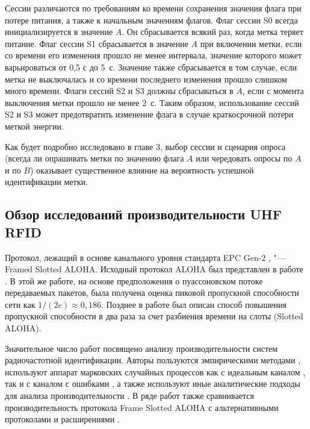 Сессии различаются по требованиям ко времени сохранения значения флага при потере питания, а также к начальным значениям флагов. Флаг сессии S0 всегда инициализируется в значение $A$. Он сбрасывается всякий раз, когда метка теряет питание. Флаг сессии S1 сбрасывается в значение $A$ при включении метки, если со времени его изменения прошло не менее интервала, значение которого может варьироваться от 0,5 с до 5~с. Значение также сбрасывается в том случае, если метка не выключалась и со времени последнего изменения прошло слишком много времени. Флаги сессий S2 и S3 должны сбрасываться в $A$, если с момента выключения метки прошло не менее 2~с. Таким образом, использование сессий S2 и S3 может предотвратить изменение флага в случае краткосрочной потери меткой энергии.

Как будет подробно исследовано в главе 3, выбор сессии и сценария опроса (всегда ли опрашивать метки по значению флага $A$ или чередовать опросы по $A$ и по $B$) оказывает существенное влияние на вероятность успешной идентификации метки.



\subsection{Обзор исследований производительности UHF RFID}

Протокол, лежащий в основе канального уровня стандарта EPC Gen-2 \cite{std_gen2}, "--- Framed Slotted ALOHA. Исходный протокол ALOHA был представлен в работе \cite{Roberts1975}. В этой же работе, на основе предположения о пуассоновском потоке передаваемых пакетов, была получена оценка пиковой пропускной способности сети как $1/(2e) \approx 0,186$. Позднее в работе \cite{Abramson1970} был описан способ повышения пропускной способности в два раза за счет разбиения времени на слоты (Slotted ALOHA).

Значительное число работ посвящено анализу производительности систем радиочастотной идентификации. Авторы пользуются эмпирическими методами \cite{Buettner2008}, используют аппарат марковских случайных процессов как с идеальным каналом \cite{Wang2009, Vahedi2012, Vales-Alonso2009, Vales-Alonso2011, Qiaoling2007}, так и с каналом с ошибками \cite{DiMarco2014}, а также используют иные аналитические подходы для анализа производительности \cite{Ahmed2016, Yan2014, Jeon2009}. В ряде работ также сравнивается производительность протокола Frame Slotted ALOHA с альтернативными протоколами и расширениями \cite{Vahedi2014, LaPorta2011}.

